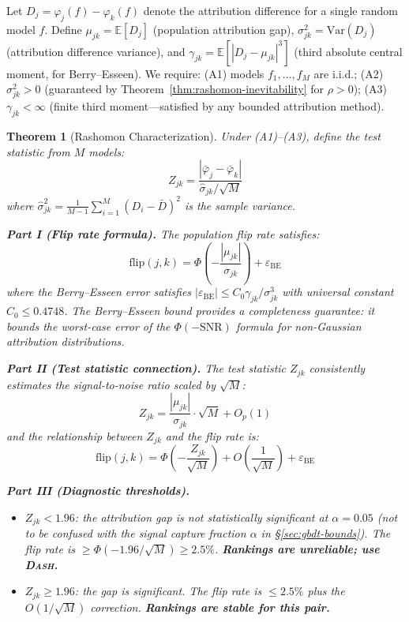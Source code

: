 \documentclass{article}
\newtheorem{theorem}{Theorem}
\newcommand{\E}{\mathbb{E}}
\newcommand{\Var}{\mathrm{Var}}
\newcommand{\DASH}{\textsc{Dash}}
\begin{document}
Let $D_j = \varphi_j(f) - \varphi_k(f)$ denote the attribution difference for a single random model $f$. Define $\mu_{jk} = \E[D_j]$ (population attribution gap), $\sigma_{jk}^2 = \Var(D_j)$ (attribution difference variance), and $\gamma_{jk} = \E[|D_j - \mu_{jk}|^3]$ (third absolute central moment, for Berry--Esseen). We require: (A1) models $f_1, \ldots, f_M$ are i.i.d.; (A2) $\sigma_{jk}^2 > 0$ (guaranteed by Theorem~\ref{thm:rashomon-inevitability} for $\rho > 0$); (A3) $\gamma_{jk} < \infty$ (finite third moment---satisfied by any bounded attribution method).

\begin{theorem}[Rashomon Characterization]
\label{thm:testable}
Under (A1)--(A3), define the test statistic from $M$ models:
\[
    Z_{jk} = \frac{|\bar\varphi_j - \bar\varphi_k|}{\hat\sigma_{jk}/\sqrt{M}}
\]
where $\hat\sigma_{jk}^2 = \frac{1}{M-1}\sum_{i=1}^M (D_i - \bar{D})^2$ is the sample variance.

\textbf{Part I (Flip rate formula).} The population flip rate satisfies:
\begin{equation}
\label{eq:flip-exact}
    \text{flip}(j,k) = \Phi\!\left(-\frac{|\mu_{jk}|}{\sigma_{jk}}\right) + \varepsilon_{\text{BE}}
\end{equation}
where the Berry--Esseen error satisfies $|\varepsilon_{\text{BE}}| \leq C_0 \gamma_{jk} / \sigma_{jk}^3$ with universal constant $C_0 \leq 0.4748$. The Berry--Esseen bound provides a completeness guarantee: it bounds the worst-case error of the $\Phi(-\text{SNR})$ formula for non-Gaussian attribution distributions.

\textbf{Part II (Test statistic connection).} The test statistic $Z_{jk}$ consistently estimates the signal-to-noise ratio scaled by $\sqrt{M}$:
\[
    Z_{jk} = \frac{|\mu_{jk}|}{\sigma_{jk}} \cdot \sqrt{M} + O_p(1)
\]
and the relationship between $Z_{jk}$ and the flip rate is:
\begin{equation}
\label{eq:flip-z}
    \text{flip}(j,k) = \Phi\!\left(-\frac{Z_{jk}}{\sqrt{M}}\right) + O\!\left(\frac{1}{\sqrt{M}}\right) + \varepsilon_{\text{BE}}
\end{equation}

\textbf{Part III (Diagnostic thresholds).}
\begin{itemize}
    \item $Z_{jk} < 1.96$: the attribution gap is not statistically significant at $\alpha = 0.05$ (not to be confused with the signal capture fraction $\alpha$ in \S\ref{sec:gbdt-bounds}). The flip rate is $\geq \Phi(-1.96/\sqrt{M}) \geq 2.5\%$. \textbf{Rankings are unreliable; use \DASH{}.}
    \item $Z_{jk} \geq 1.96$: the gap is significant. The flip rate is $\leq 2.5\%$ plus the $O(1/\sqrt{M})$ correction. \textbf{Rankings are stable for this pair.}
\end{itemize}
\end{theorem}
\end{document}
